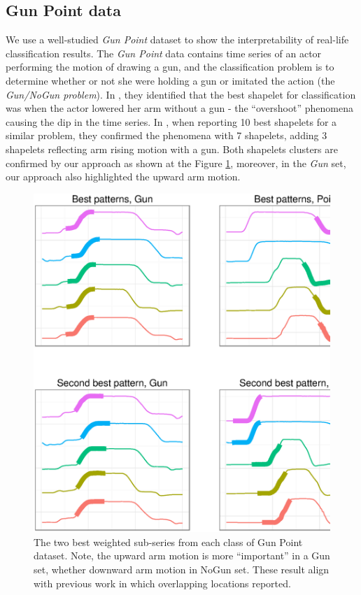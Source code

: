 \documentclass{llncs}
\begin{document}
\subsection{Gun Point data}
We use a well-studied \textit{Gun Point} dataset to show the interpretability of real-life
classification results. The \textit{Gun Point} data contains time series of an actor performing the
motion of drawing a gun, and the classification problem is to determine whether or not she were
holding a gun or imitated the action (the \textit{Gun/NoGun problem}). In \cite{shapelet}, they
identified that the best shapelet for classification was when the actor lowered her arm without a
gun - the ``overshoot'' phenomena causing the dip in the time series. In \cite{bagnal}, when
reporting 10 best shapelets for a similar problem, they confirmed the phenomena with 7 shapelets,
adding 3 shapelets reflecting arm rising motion with a gun. Both shapelets clusters are confirmed by
our approach as shown at the Figure \ref{fig:shapelet-like-patterns}, moreover, in the \textit{Gun}
set, our approach also highlighted the upward arm motion.

\begin{figure}[tbp]
   \centering
   \includegraphics[width=120mm]{figures/shapelet-patterns.ps}
   \caption{The two best weighted sub-series from each class of Gun Point dataset. 
   Note, the upward arm motion is more ``important'' in a Gun set, whether downward arm motion in
   NoGun set. These result align with previous work \cite{shapelet} \cite{bagnal} in which 
   overlapping locations reported.
   }
   \label{fig:shapelet-like-patterns}
\end{figure}
\end{document}
